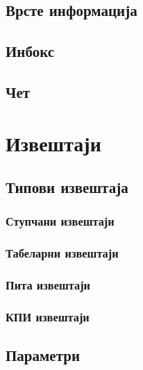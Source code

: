 \documentclass[a4paper,10pt,english]{report}
\begin{document}
\subsection{Врсте информација}
\label{\detokenize{prirucnik/posta:id2}}

\subsection{Инбокс}
\label{\detokenize{prirucnik/posta:id3}}

\subsection{Чет}
\label{\detokenize{prirucnik/posta:id4}}

\section{Извештаји}
\label{\detokenize{prirucnik/izvestaji:izvestaji}}\label{\detokenize{prirucnik/izvestaji:id1}}\label{\detokenize{prirucnik/izvestaji::doc}}

\subsection{Типови извештаја}
\label{\detokenize{prirucnik/izvestaji:id2}}

\subsubsection{Ступчани извештаји}
\label{\detokenize{prirucnik/izvestaji:id3}}

\subsubsection{Табеларни извештаји}
\label{\detokenize{prirucnik/izvestaji:id4}}

\subsubsection{Пита извештаји}
\label{\detokenize{prirucnik/izvestaji:id5}}

\subsubsection{КПИ извештаји}
\label{\detokenize{prirucnik/izvestaji:id6}}

\subsection{Параметри}
\label{\detokenize{prirucnik/izvestaji:id7}}
\end{document}
